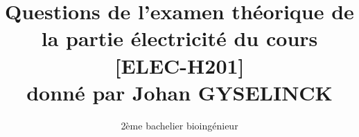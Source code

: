 


\author{2ème bachelier bioingénieur}

\title{Questions de l'examen théorique de la partie électricité du cours [ELEC-H201]\\ donné par Johan GYSELINCK}

\pagestyle{headandfoot}





\maketitle
\thispagestyle{headandfoot}


